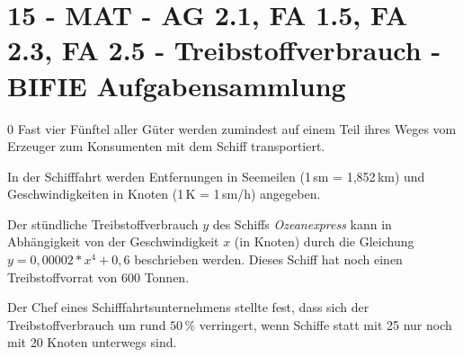 \section{15 - MAT - AG 2.1, FA 1.5, FA 2.3, FA 2.5 - Treibstoffverbrauch - BIFIE Aufgabensammlung}

\begin{langesbeispiel} \item[0] %
Fast vier Fünftel aller Güter werden zumindest auf einem Teil ihres Weges vom Erzeuger zum Konsumenten mit dem Schiff transportiert.
				
				In der Schifffahrt werden Entfernungen in Seemeilen (1\,sm = 1,852\,km) und Geschwindigkeiten in Knoten (1\,K = 1\,sm/h) angegeben.
				
				Der stündliche Treibstoffverbrauch $y$ des Schiffs \textit{Ozeanexpress} kann in Abhängigkeit von der Geschwindigkeit $x$ (in Knoten) durch die Gleichung\\ 
				$y=0,00002*x^4+0,6$ beschrieben werden. Dieses Schiff hat noch einen Treibstoffvorrat von 600 Tonnen.%

\begin{aufgabenstellung}
\item %


\item Der Chef eines Schifffahrtsunternehmens stellte fest, dass sich der Treibstoffverbrauch um rund $50\,\%$ verringert, wenn Schiffe statt mit 25 nur noch mit 20 Knoten unterwegs sind.
	

\end{aufgabenstellung}
\end{langesbeispiel}
